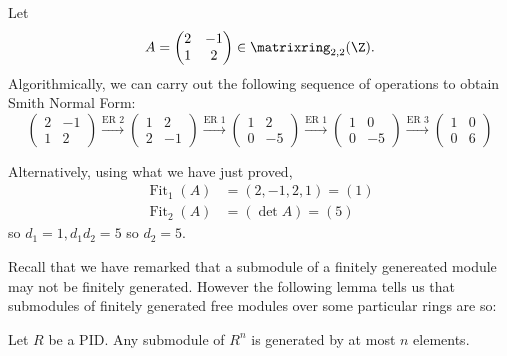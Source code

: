 \documentclass[a4paper]{article}
\theoremstyle{definition}
\DeclareMathOperator{\fit}{Fit}
\begin{document}
\begin{eg}
  Let
  \[
    A =
    \begin{pmatrix}
      2 & -1 \\
      1 & 2
    \end{pmatrix}
    \in \matrixring_{2, 2}(\Z).
  \]
  Algorithmically, we can carry out the following sequence of operations to obtain Smith Normal Form:
  \[
    \begin{pmatrix}
      2 & -1 \\
      1 & 2
    \end{pmatrix}
    \stackrel{\text{ER } 2}{\to}
    \begin{pmatrix}
      1 & 2 \\
      2 & -1
    \end{pmatrix}
    \stackrel{\text{ER } 1}{\to}
    \begin{pmatrix}
      1 & 2 \\
      0 & -5
    \end{pmatrix}
    \stackrel{\text{ER } 1}{\to}
    \begin{pmatrix}
      1 & 0 \\
      0 & -5
    \end{pmatrix}
    \stackrel{\text{ER } 3}{\to}
    \begin{pmatrix}
      1 & 0 \\
      0 & 6
    \end{pmatrix}
  \]

  Alternatively, using what we have just proved,
  \begin{align*}
    \fit_1(A) &= (2, -1, 2, 1) = (1) \\
    \fit_2(A) &= (\det A) = (5)
  \end{align*}
  so \(d_1 = 1, d_1d_2 = 5\) so \(d_2 = 5\).
\end{eg}

Recall that we have remarked that a submodule of a finitely genereated module may not be finitely generated. However the following lemma tells us that submodules of finitely generated free modules over some particular rings are so:

\begin{lemma}
  Let \(R\) be a PID. Any submodule of \(R^n\) is generated by at most \(n\) elements.
\end{lemma}
\end{document}
